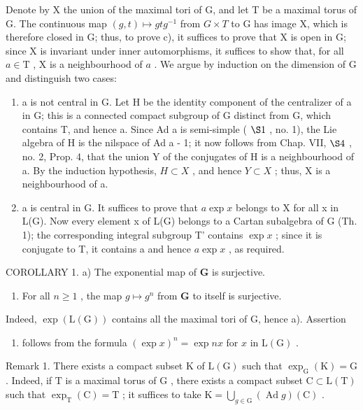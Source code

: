 Denote by X the union of the maximal tori of G, and let T be a maximal torus of G. The continuous map \((g,t)\mapsto gtg^{-1}\) from \(G\times T\) to G has image X, which is therefore closed in G; thus, to prove c), it suffices to prove that X is open in G; since X is invariant under inner automorphisms, it suffices to show that, for all \(a \in \mathrm{T}\) , \(\mathrm{X}\) is a neighbourhood of \(a\) . We argue by induction on the dimension of \(\mathrm{G}\) and distinguish two cases:

\begin{enumerate}
\def\labelenumi{\arabic{enumi})}
\item
  a is not central in G. Let H be the identity component of the centralizer of a in G; this is a connected compact subgroup of G distinct from G, which contains T, and hence a. Since Ad a is semi-simple ( \(\S1\) , no. 1), the Lie algebra of H is the nilspace of Ad a - 1; it now follows from Chap. VII, \(\S4\) , no. 2, Prop. 4, that the union Y of the conjugates of H is a neighbourhood of a. By the induction hypothesis, \(H \subset X\) , and hence \(Y \subset X\) ; thus, X is a neighbourhood of a.
\item
  a is central in G. It suffices to prove that \(a \exp x\) belongs to X for all x in L(G). Now every element x of L(G) belongs to a Cartan subalgebra of G (Th. 1); the corresponding integral subgroup T' contains \(\exp x\) ; since it is conjugate to T, it contains a and hence \(a \exp x\) , as required.
\end{enumerate}

COROLLARY 1. a) The exponential map of \(\mathbf{G}\) is surjective.

\begin{enumerate}
\def\labelenumi{\alph{enumi})}
\setcounter{enumi}{1}
\tightlist
\item
  For all \(n \geq 1\) , the map \(g \mapsto g^n\) from \(\mathbf{G}\) to itself is surjective.
\end{enumerate}

Indeed, \(\exp(\mathrm{L}(\mathrm{G}))\) contains all the maximal tori of G, hence a). Assertion

\begin{enumerate}
\def\labelenumi{\alph{enumi})}
\setcounter{enumi}{1}
\tightlist
\item
  follows from the formula \((\exp x)^n = \exp nx\) for \(x\) in \(\mathrm{L}(\mathrm{G})\) .
\end{enumerate}

Remark 1. There exists a compact subset \(\mathrm{K}\) of \(\mathrm{L}(\mathrm{G})\) such that \(\exp_{\mathrm{G}}(\mathrm{K}) = \mathrm{G}\) . Indeed, if \(\mathrm{T}\) is a maximal torus of \(\mathrm{G}\) , there exists a compact subset \(\mathrm{C} \subset \mathrm{L}(\mathrm{T})\) such that \(\exp_{\mathrm{T}}(\mathrm{C}) = \mathrm{T}\) ; it suffices to take \(\mathrm{K} = \bigcup_{g \in \mathrm{G}} (\operatorname{Ad} g)(\mathrm{C})\) .

